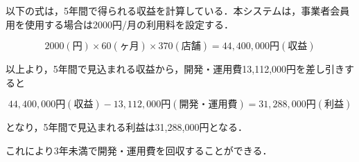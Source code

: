 以下の式は，5年間で得られる収益を計算している．本システムは，事業者会員用を使用する場合は2000円/月の利用料を設定する．

\[2000(円)\times 60(ヶ月)\times 370(店舗)=44,400,000円(収益)\]

以上より，5年間で見込まれる収益から，開発・運用費13,112,000円を差し引きすると

\[44,400,000円(収益)-13,112,000円(開発・運用費)=31,288,000円(利益)\]

となり，5年間で見込まれる利益は31,288,000円となる．

これにより3年未満で開発・運用費を回収することができる．









